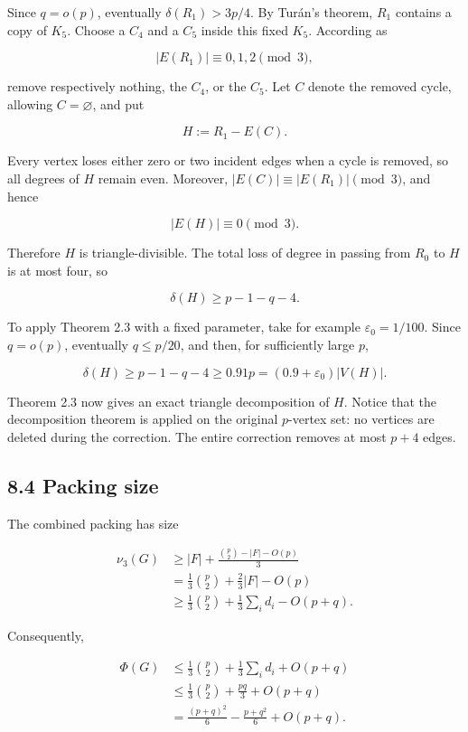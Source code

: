 \documentclass[11pt,a4paper]{article}
\begin{document}
Since \(q=o(p)\), eventually \(\delta(R_1)>3p/4\). By Turán's theorem, \(R_1\) contains a copy of \(K_5\). Choose a \(C_4\) and a \(C_5\) inside this fixed \(K_5\). According as

\[
|E(R_1)|\equiv0,1,2\pmod3,
\]

remove respectively nothing, the \(C_4\), or the \(C_5\). Let \(C\) denote the removed cycle, allowing \(C=\varnothing\), and put

\[
H:=R_1-E(C).
\]

Every vertex loses either zero or two incident edges when a cycle is removed, so all degrees of \(H\) remain even. Moreover, \(|E(C)|\equiv |E(R_1)|\pmod3\), and hence

\[
|E(H)|\equiv0\pmod3.
\]

Therefore \(H\) is triangle-divisible. The total loss of degree in passing from \(R_0\) to \(H\) is at most four, so

\[
\delta(H)\ge p-1-q-4.
\tag{8.8}
\]

To apply Theorem 2.3 with a fixed parameter, take for example \(\varepsilon_0=1/100\). Since \(q=o(p)\), eventually \(q\le p/20\), and then, for sufficiently large \(p\),

\[
\delta(H)\ge p-1-q-4\ge0.91p=(0.9+\varepsilon_0)|V(H)|.
\tag{8.9}
\]

Theorem 2.3 now gives an exact triangle decomposition of \(H\). Notice that the decomposition theorem is applied on the original \(p\)-vertex set: no vertices are deleted during the correction. The entire correction removes at most \(p+4\) edges.

\subsection{8.4 Packing size}\label{packing-size}

The combined packing has size

\[
\begin{aligned}
\nu_3(G)
&\ge
|F|+\frac{\binom p2-|F|-O(p)}3\\
&=
\frac13\binom p2+\frac23|F|-O(p)\\
&\ge
\frac13\binom p2+\frac13\sum_i d_i-O(p+q).
\end{aligned}
\tag{8.10}
\]

Consequently,

\[
\begin{aligned}
\Phi(G)
&\le
\frac13\binom p2+\frac13\sum_i d_i+O(p+q)\\
&\le
\frac13\binom p2+\frac{pq}{3}+O(p+q)\\
&=
\frac{(p+q)^2}{6}-\frac{p+q^2}{6}+O(p+q).
\end{aligned}
\tag{8.11}
\]
\end{document}
